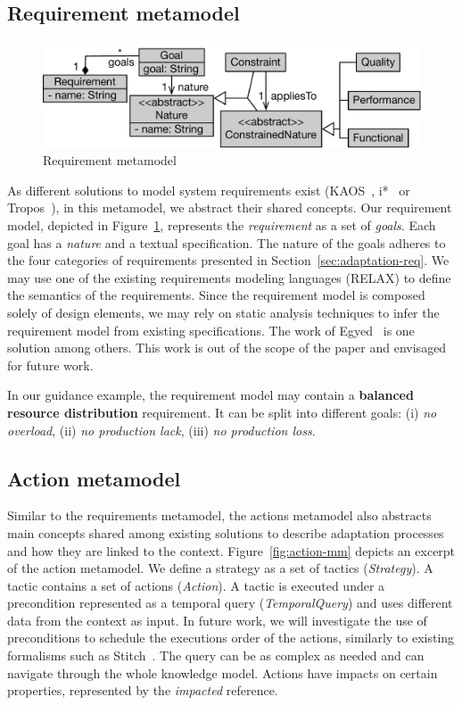 \subsection{Requirement metamodel}

\begin{figure}
	\centering
	\includegraphics[width=0.7\linewidth]{img/chapt-tkm/mm/requirementModel}
	\caption{Requirement metamodel}
	\label{fig:requirement-model}
\end{figure}

As different solutions to model system requirements exist (\eg KAOS~\cite{dardenne1993goal}, i*~\cite{yu2011modelling} or Tropos~\cite{DBLP:journals/aamas/BrescianiPGGM04}), in this metamodel, we abstract their shared concepts.
Our requirement model, depicted in Figure~\ref{fig:requirement-model}, represents the \textit{requirement} as a set of \textit{goals}.
Each goal has a \textit{nature} and a textual specification.
The nature of the goals adheres to the four categories of requirements presented in Section~\ref{sec:adaptation-req}.
We may use one of the existing requirements modeling languages (\eg RELAX) to define the semantics of the requirements. Since the requirement model is composed solely of design elements, we may rely on static analysis techniques to infer the requirement model from existing specifications. The work of Egyed~\cite{egyed01} is one solution among others. This work is out of the scope of the paper and envisaged for future work. 

In our guidance example, the requirement model may contain a \textbf{balanced resource distribution} requirement. It can be split into different goals: (i) \textit{no overload}, (ii) \textit{no production lack}, (iii) \textit{no production loss}.

\subsection{Action metamodel}
\label{sec:action-mm}

Similar to the requirements metamodel, the actions metamodel also abstracts main concepts shared among existing solutions to describe adaptation processes and how they are linked to the context. Figure~\ref{fig:action-mm} depicts an excerpt of the action metamodel.
We define a strategy as a set of tactics (\textit{Strategy}).
A tactic contains a set of actions (\textit{Action}).
A tactic is executed under a precondition represented as a temporal query (\textit{TemporalQuery}) and uses different data from the context as input. In future work, we will investigate the use of preconditions to schedule the executions order of the actions, similarly to existing formalisms such as Stitch~\cite{DBLP:journals/jss/ChengG12}.
The query can be as complex as needed and can navigate through the whole knowledge model.
Actions have impacts on certain properties, represented by the \textit{impacted} reference. 

